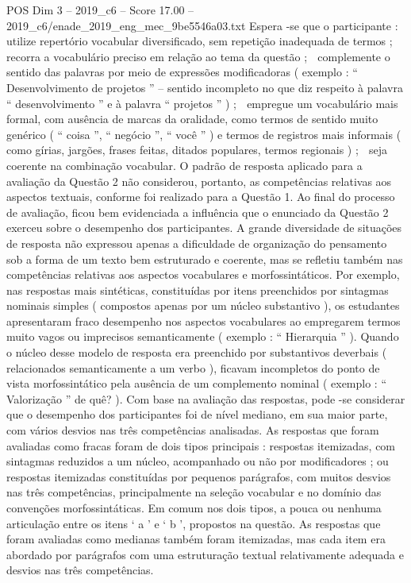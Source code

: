 \begin{textsample}{POS Dim 3 – 2019\_c6 – Score 17.00 – 2019\_c6/enade\_2019\_eng\_mec\_9be5546a03.txt}
Espera -se que o participante :  utilize repertório vocabular diversificado, sem repetição inadequada de termos ;  recorra a vocabulário preciso em relação ao tema da questão ;  complemente o sentido das palavras por meio de expressões modificadoras ( exemplo : “ Desenvolvimento de projetos ” – sentido incompleto no que diz respeito à palavra “ desenvolvimento ” e à palavra “ projetos ” ) ;  empregue um vocabulário mais formal, com ausência de marcas da oralidade, como termos de sentido muito genérico ( “ coisa ”, “ negócio ”, “ você ” ) e termos de registros mais informais ( como gírias, jargões, frases feitas, ditados populares, termos regionais ) ;  seja coerente na combinação vocabular.
O padrão de resposta aplicado para a avaliação da Questão 2 não considerou, portanto, as competências relativas aos aspectos textuais, conforme foi realizado para a Questão 1.
Ao final do processo de avaliação, ficou bem evidenciada a influência que o enunciado da Questão 2 exerceu sobre o desempenho dos participantes.
A grande diversidade de situações de resposta não expressou apenas a dificuldade de organização do pensamento sob a forma de um texto bem estruturado e coerente, mas se refletiu também nas competências relativas aos aspectos vocabulares e morfossintáticos.
Por exemplo, nas respostas mais sintéticas, constituídas por itens preenchidos por sintagmas nominais simples ( compostos apenas por um núcleo substantivo ), os estudantes apresentaram fraco desempenho nos aspectos vocabulares ao empregarem termos muito vagos ou imprecisos semanticamente ( exemplo : “ Hierarquia ” ).
Quando o núcleo desse modelo de resposta era preenchido por substantivos deverbais ( relacionados semanticamente a um verbo ), ficavam incompletos do ponto de vista morfossintático pela ausência de um complemento nominal ( exemplo : “ Valorização ” de quê? ).
Com base na avaliação das respostas, pode -se considerar que o desempenho dos participantes foi de nível mediano, em sua maior parte, com vários desvios nas três competências analisadas.
As respostas que foram avaliadas como fracas foram de dois tipos principais : respostas itemizadas, com sintagmas reduzidos a um núcleo, acompanhado ou não por modificadores ; ou respostas itemizadas constituídas por pequenos parágrafos, com muitos desvios nas três competências, principalmente na seleção vocabular e no domínio das convenções morfossintáticas.
Em comum nos dois tipos, a pouca ou nenhuma articulação entre os itens ‘ a ’ e ‘ b ’, propostos na questão.
As respostas que foram avaliadas como medianas também foram itemizadas, mas cada item era abordado por parágrafos com uma estruturação textual relativamente adequada e desvios nas três competências.

\end{textsample}
